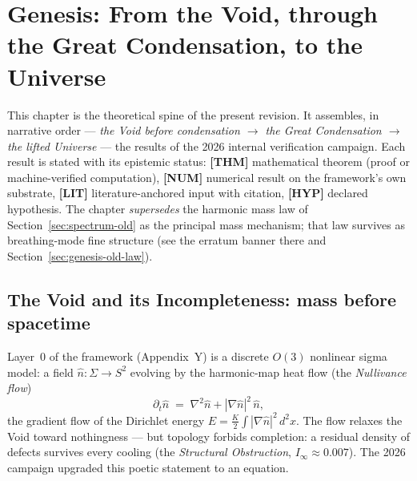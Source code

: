 \section{Genesis: From the Void, through the Great Condensation, to the Universe}
\label{sec:genesis}

\begin{mdframed}[backgroundcolor=blue!5, frametitle={Scope and status of this chapter (2026 revision)}]
This chapter is the theoretical spine of the present revision. It assembles, in narrative order
--- \emph{the Void before condensation $\to$ the Great Condensation $\to$ the lifted Universe} ---
the results of the 2026 internal verification campaign. Each result is stated with its
epistemic status: \textbf{[THM]} mathematical theorem (proof or machine-verified computation),
\textbf{[NUM]} numerical result on the framework's own substrate, \textbf{[LIT]} literature-anchored
input with citation, \textbf{[HYP]} declared hypothesis. The chapter \emph{supersedes} the
harmonic mass law of Section~\ref{sec:spectrum-old} as the principal mass mechanism; that law
survives as breathing-mode fine structure (see the erratum banner there and
Section~\ref{sec:genesis-old-law}).
\end{mdframed}

\subsection{The Void and its Incompleteness: mass before spacetime}
\label{sec:genesis-void}

Layer~0 of the framework (Appendix~Y) is a discrete $O(3)$ nonlinear sigma model: a field
$\hat n:\Sigma\to S^2$ evolving by the harmonic-map heat flow (the \emph{Nullivance flow})
\begin{equation}
\partial_t \hat n \;=\; \nabla^2 \hat n + |\nabla \hat n|^2\,\hat n ,
\end{equation}
the gradient flow of the Dirichlet energy $E=\tfrac{K}{2}\int |\nabla \hat n|^2\,d^2x$.
The flow relaxes the Void toward nothingness --- but topology forbids completion: a residual
density of defects survives every cooling (the \emph{Structural Obstruction},
$I_\infty \approx 0.007$). The 2026 campaign upgraded this poetic statement to an equation.

